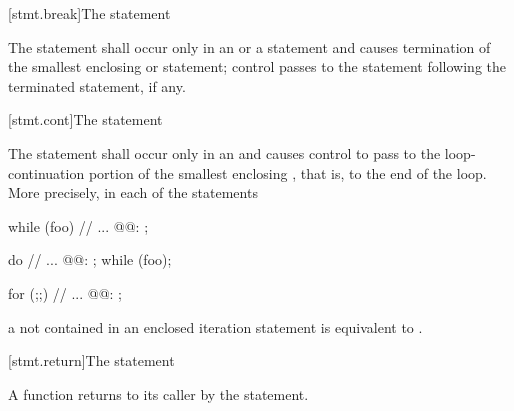 [stmt.break]{The  statement}%

\pnum
The  statement shall occur only in an
%
%
 or a  statement and causes
termination of the smallest enclosing  or
 statement; control passes to the statement following the
terminated statement, if any.

[stmt.cont]{The  statement}%

\pnum
The
statement shall occur only in an
%
and causes control to pass to the loop-continuation portion of the
smallest enclosing , that is, to the end
of the loop. More precisely, in each of the statements

\begin{minipage}{.30\hsize}
\begin{codeblock}
while (foo) {
  {
    // ...
  }
@@: ;
}
\end{codeblock}
\end{minipage}
\begin{minipage}{.30\hsize}
\begin{codeblock}
do {
  {
    // ...
  }
@@: ;
} while (foo);
\end{codeblock}
\end{minipage}
\begin{minipage}{.30\hsize}
\begin{codeblock}
for (;;) {
  {
    // ...
  }
@@: ;
}
\end{codeblock}
\end{minipage}

a  not contained in an enclosed iteration statement is
equivalent to  .

[stmt.return]{The  statement}%
%
%

\pnum
A function returns to its caller by the  statement.

